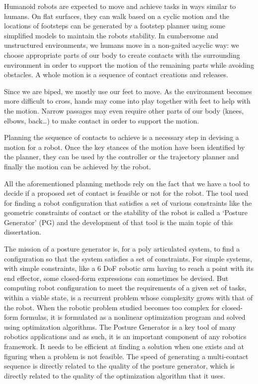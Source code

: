 Humanoid robots are expected to move and achieve tasks in ways similar to humans.
On flat surfaces, they can walk based on a cyclic motion and the locations of footsteps can be generated by a footstep planner using some simplified models to maintain the robots stability.
In cumbersome and unstructured environments, we humans move in a non-gaited acyclic way: we choose appropriate parts of our body to create contacts with the surrounding environment in order to support the motion of the remaining parts while avoiding obstacles.
A whole motion is a sequence of contact creations and releases.

Since we are biped, we mostly use our feet to move.
As the environment becomes more difficult to cross, hands may come into play together with feet to help with the motion.
Narrow passages may even require other parts of our body (knees, elbows, back\dots) to make contact in order to support the motion.

Planning the sequence of contacts to achieve is a necessary step in devising a motion for a robot.
Once the key stances of the motion have been identified by the planner, they can be used by the controller or the trajectory planner and finally the motion can be achieved by the robot.

All the aforementioned planning methods rely on the fact that we have a tool to decide if a proposed set of contact is feasible or not for the robot.
The tool used for finding a robot configuration that satisfies a set of various constraints like the geometric constraints of contact or the stability of the robot is called a `Posture Generator' (PG) and the development of that tool is the main topic of this dissertation.

The mission of a posture generator is, for a poly articulated system, to find a configuration so that the system satisfies a set of constraints.
For simple systems, with simple constraints, like a 6 DoF robotic arm having to reach a point with its end effector, some closed-form expressions can sometimes be devised.
But computing robot configuration to meet the requirements of a given set of tasks, within a viable state, is a recurrent problem whose complexity grows with that of the robot.
When the robotic problem studied becomes too complex for closed-form formulas, it is formulated as a nonlinear optimization program and solved using optimization algorithms.
The Posture Generator is a key tool of many robotics applications and as such, it is an important component of any robotics framework.
It needs to be efficient at finding a solution when one exists and at figuring when a problem is not feasible.
The speed of generating a multi-contact sequence is directly related to the quality of the posture generator, which is directly related to the quality of the optimization algorithm that it uses.

